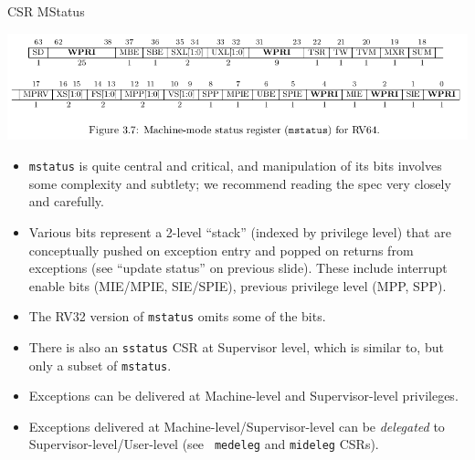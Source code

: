 \documentclass{article}
\begin{document}

\begin{center}
  {\Huge
    CSR MStatus}

  \vspace*{0.3in}

  \begin{minipage}{9.5in}\Large
    \begin{center}
      \includegraphics[width=8in]{Figs/CSR_RV64_MStatus.png}
    \end{center}

    \vspace*{0.3in}

    \begin{itemize}
    \item {\tt mstatus} is quite central and critical, and
      manipulation of its bits involves some complexity and subtlety;
      we recommend reading the spec very closely and carefully.

    \item Various bits represent a 2-level ``stack'' (indexed by
      privilege level) that are conceptually pushed on exception entry
      and popped on returns from exceptions (see ``update status'' on
      previous slide).  These include interrupt enable bits (MIE/MPIE,
      SIE/SPIE), previous privilege level (MPP, SPP).

    \item The RV32 version of {\tt mstatus} omits some of the bits.

    \item There is also an {\tt sstatus} CSR at Supervisor level,
      which is similar to, but only a subset of {\tt mstatus}.

    \item Exceptions can be delivered at Machine-level and Supervisor-level privileges.

    \item Exceptions delivered at Machine-level/Supervisor-level can
      be \emph{delegated} to Supervisor-level/User-level (see {\tt
        medeleg} and {\tt mideleg} CSRs).
    \end{itemize}
  \end{minipage}

\end{center}
\end{document}
